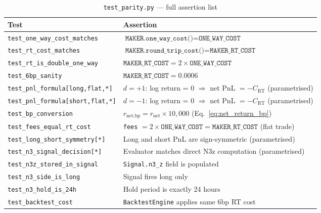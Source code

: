 \documentclass[12pt, a4paper]{article}
\theoremstyle{definition}
\begin{document}
\begin{table}[H]
\centering
\caption{\texttt{test\_parity.py} — full assertion list}
\begin{tabularx}{\linewidth}{lX}
\toprule
\textbf{Test} & \textbf{Assertion} \\
\midrule
\texttt{test\_one\_way\_cost\_matches}       & $\texttt{MAKER.one\_way\_cost()} = \texttt{ONE\_WAY\_COST}$ \\
\texttt{test\_rt\_cost\_matches}             & $\texttt{MAKER.round\_trip\_cost()} = \texttt{MAKER\_RT\_COST}$ \\
\texttt{test\_rt\_is\_double\_one\_way}      & $\texttt{MAKER\_RT\_COST} = 2 \times \texttt{ONE\_WAY\_COST}$ \\
\texttt{test\_6bp\_sanity}                   & $\texttt{MAKER\_RT\_COST} = 0.0006$ \\
\texttt{test\_pnl\_formula[long,flat,*]}     & $d{=}+1$: log return = 0 $\Rightarrow$ net PnL $= -C_\text{RT}$ (parametrised) \\
\texttt{test\_pnl\_formula[short,flat,*]}    & $d{=}-1$: log return = 0 $\Rightarrow$ net PnL $= -C_\text{RT}$ (parametrised) \\
\texttt{test\_bp\_conversion}               & $r_{\text{net,bp}} = r_{\text{net}} \times 10{,}000$ (Eq.~\ref{eq:net_return_bp}) \\
\texttt{test\_fees\_equal\_rt\_cost}         & \texttt{fees} $= 2\times\texttt{ONE\_WAY\_COST} = \texttt{MAKER\_RT\_COST}$ (flat trade) \\
\texttt{test\_long\_short\_symmetry[*]}      & Long and short PnL are sign-symmetric (parametrised) \\
\texttt{test\_n3\_signal\_decision[*]}       & Evaluator matches direct N3z computation (parametrised) \\
\texttt{test\_n3z\_stored\_in\_signal}       & \texttt{Signal.n3\_z} field is populated \\
\texttt{test\_n3\_side\_is\_long}            & Signal fires long only \\
\texttt{test\_n3\_hold\_is\_24h}             & Hold period is exactly 24 hours \\
\texttt{test\_backtest\_cost}               & \texttt{BacktestEngine} applies same 6bp RT cost \\
\bottomrule
\end{tabularx}
\end{table}
\end{document}
